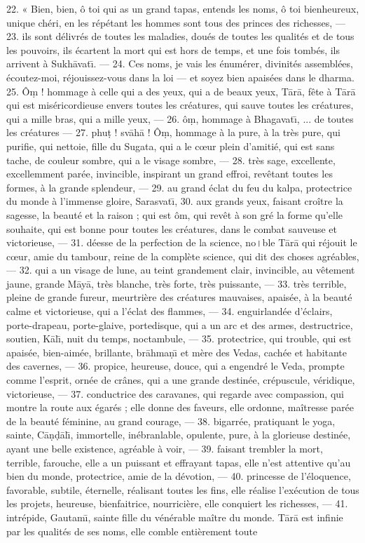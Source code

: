 \documentclass[a4paper, 11pt, oneside, french]{article}
\begin{document}
22. « Bien, bien, ô toi qui as un grand tapas, entends les noms, ô toi bienheureux, unique chéri, en les répétant les hommes sont tous des princes des richesses, --- 23. ils sont délivrés de toutes les maladies, doués de toutes les qualités et de tous les pouvoirs, ils écartent la mort qui est hors de temps, et une fois tombés, ils arrivent à Sukh\={a}vat\={\i}. --- 24. Ces noms, je vais les énumérer, divinités assemblées, écoutez-moi, réjouissez-vous dans la loi --- et soyez bien apaisées dans le dharma. 25. Ô\d{m} ! hommage à celle qui a des yeux, qui a de beaux yeux, T\={a}r\={a}, fête à T\={a}r\={a} qui est miséricordieuse envers toutes les créatures, qui sauve toutes les créatures, qui a mille bras, qui a mille yeux, --- 26. ô\d{m}, hommage à Bhagavat\={\i}, ... de toutes les créatures --- 27. phu\d{t} ! sv\={a}h\={a} ! Ô\d{m}, hommage à la pure, à la très pure, qui purifie, qui nettoie, fille du Sugata, qui a le cœur plein d'amitié, qui est sans tache, de couleur sombre, qui a le visage sombre, --- 28. très sage, excellente, excellemment parée, invincible, inspirant un grand effroi, revêtant toutes les formes, à la grande splendeur, --- 29. au grand éclat du feu du kalpa, protectrice du monde à l'immense gloire, Sarasvat\={\i}, 30. aux grands yeux, faisant croître la sagesse, la beauté et la raison ; qui est ôm, qui revêt à son gré la forme qu'elle souhaite, qui est bonne pour toutes les créatures, dans le combat sauveuse et victorieuse, --- 31. déesse de la perfection de la science, no।ble T\={a}r\={a} qui réjouit le cœur, amie du tambour, reine de la complète science, qui dit des choses agréables,--- 32. qui a un visage de lune, au teint grandement clair, invincible, au vêtement jaune, grande M\={a}y\={a}, très blanche, très forte, très puissante, --- 33. très terrible, pleine de grande fureur, meurtrière des créatures mauvaises, apaisée, à la beauté calme et victorieuse, qui a l'éclat des flammes, --- 34. enguirlandée d'éclairs, porte-drapeau, porte-glaive, portedisque, qui a un arc et des armes, destructrice, soutien, K\={a}l\={\i}, nuit du temps, noctambule, --- 35. protectrice, qui trouble, qui est apaisée, bien-aimée, brillante, br\={a}hma\d{n}\={\i} et mère des Vedas, cachée et habitante des cavernes, --- 36. propice, heureuse, douce, qui a engendré le Veda, prompte comme l'esprit, ornée de crânes, qui a une grande destinée, crépuscule, véridique, victorieuse, --- 37. conductrice des caravanes, qui regarde avec compassion, qui montre la route aux égarés ; elle donne des faveurs, elle ordonne, maîtresse parée de la beauté féminine, au grand courage, --- 38. bigarrée, pratiquant le yoga, sainte, C\={a}\d{n}\d{d}\={a}l\={\i}, immortelle, inébranlable, opulente, pure, à la glorieuse destinée, ayant une belle existence, agréable à voir, --- 39. faisant trembler la mort, terrible, farouche, elle a un puissant et effrayant tapas, elle n'est attentive qu'au bien du monde, protectrice, amie de la dévotion, --- 40. princesse de l'éloquence, favorable, subtile, éternelle, réalisant toutes les fins, elle réalise l'exécution de tous les projets, heureuse, bienfaitrice, nourricière, elle conquiert les richesses, --- 41. intrépide, Gautam\={\i}, sainte fille du vénérable maître du monde. T\={a}r\={a} est infinie par les qualités de ses noms, elle comble entièrement toute 
\end{document}
